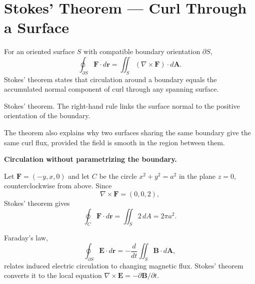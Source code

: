 \section{Stokes' Theorem --- Curl Through a Surface}
\label{sec:stokes-theorem}

For an oriented surface $S$ with compatible boundary orientation $\partial S$,
\[
\boxed{\oint_{\partial S}\mathbf F\cdot d\mathbf r
=\iint_S(\nabla\times\mathbf F)\cdot d\mathbf A.}
\]
Stokes' theorem states that circulation around a boundary equals the accumulated normal component of curl through any spanning surface.

\begin{bookfigure}{Stokes' theorem. The right-hand rule links the surface normal to the positive orientation of the boundary.}

\label{fig:stokes-orientation}
\end{bookfigure}

The theorem also explains why two surfaces sharing the same boundary give the same curl flux, provided the field is smooth in the region between them.

\begin{workedexample}
\textbf{Circulation without parametrizing the boundary.}\par
Let $\mathbf F=(-y,x,0)$ and let $C$ be the circle $x^2+y^2=a^2$ in the plane $z=0$, counterclockwise from above. Since
\[
\nabla\times\mathbf F=(0,0,2),
\]
Stokes' theorem gives
\[
\oint_C\mathbf F\cdot d\mathbf r
=\iint_S2\,dA=2\pi a^2.
\]
\end{workedexample}

\begin{keyidea}
Faraday's law,
\[
\oint_{\partial S}\mathbf E\cdot d\mathbf r
=-\frac{d}{dt}\iint_S\mathbf B\cdot d\mathbf A,
\]
relates induced electric circulation to changing magnetic flux. Stokes' theorem converts it to the local equation $\nabla\times\mathbf E=-\partial\mathbf B/\partial t$.
\end{keyidea}
